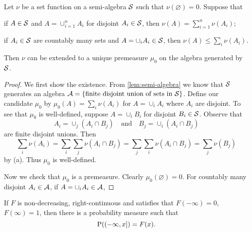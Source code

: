 \begin{theorem}
    Let $\nu$ be a set function on a semi-algebra $\S$ such that 
    $\nu(\varnothing) = 0$. Suppose that 
    \begin{thmenum}
        \item if $A\in\S$ and $A = \cup_{i=1}^n A_i$ for disjoint $A_i\in\S$, 
        then $\nu(A) = \sum_{i=1}^n \nu(A_i)$;
        \item if $A_i\in\S$ are countably many sets and $A = \cup_i A_i\in\S$, 
        then $\nu(A) \leq \sum_i \nu(A_i)$.
    \end{thmenum}
    Then $\nu$ can be extended to a unique premeasure $\mu_0$ on the 
    algebra generated by $\S$.
\end{theorem}
\begin{proof}
    We first show the existence. From \cref{lem:semi-algebra} we 
    know that $\S$ generates an algebra $\A = 
    \set{\text{finite disjoint union of sets in }\S}$. Define 
    our candidate $\mu_0$ by $\mu_0(A) = \sum_i\nu(A_i)$ 
    for $A = \cup_i A_i$ where $A_i$ are disjoint. To see that 
    $\mu_0$ is well-defined, suppose $A = \cup_i B_i$ 
    for disjoint $B_i\in\S$. Observe that 
    \begin{equation*}
        A_i = \cup_j (A_i\cap B_j) \quad\text{and}\quad
        B_j = \cup_i (A_i\cap B_j)
    \end{equation*}
    are finite disjoint unions. Then 
    \begin{equation*}
        \sum_i \nu(A_i) = \sum_i\sum_j\nu(A_i\cap B_j) 
        = \sum_j\sum_i\nu(A_i\cap B_j) = \sum_j \nu(B_j) 
    \end{equation*}
    by (a). Thus $\mu_0$ is well-defined. 
    
    Now we check that $\mu_0$ is a premeasure. Clearly 
    $\mu_0(\varnothing) = 0$. For countably many disjoint 
    $A_i\in\A$, if $A = \cup_i A_i\in\A$, 
\end{proof}

\begin{theorem}
    If $F$ is non-decreasing, right-continuous and satisfies that $F(-\infty) = 0$, 
    $F(\infty) = 1$, then there is a probability measure such that 
    \begin{equation*}
        \P((-\infty, x]) = F(x). 
    \end{equation*}
\end{theorem}
